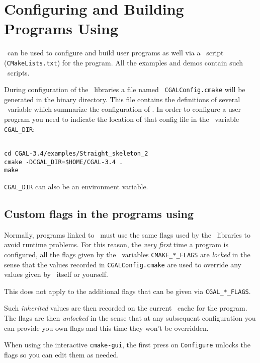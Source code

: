 \section{Configuring and Building Programs Using \cgal}

\cmake\ can be used to configure and build user programs as well via a \cmake\ 
script ({\tt CMakeLists.txt}) for the program.  All the examples and
demos contain such \cmake\ scripts.

During configuration of the \cgal\ libraries a file named {\tt
CGALConfig.cmake} will be generated in the binary directory. This file
contains the definitions of several \cmake\ variable which summarize the
configuration of \cgal. In order to configure a user program you need
to indicate the location of that config file in the \cmake\ variable
\texttt{CGAL\_DIR}:

{\ccTexHtml{\scriptsize}{}
\begin{verbatim}

cd CGAL-3.4/examples/Straight_skeleton_2
cmake -DCGAL_DIR=$HOME/CGAL-3.4 .
make

\end{verbatim}
}

\texttt{CGAL\_DIR} can also be an environment variable.

\subsection{Custom flags in the programs using \cgal}

Normally, programs linked to \cgal\ must use the same flags used by the \cgal\
libraries to avoid runtime problems. For this reason, the {\em very first} time
a program is configured, all the flags given by the \cmake\ variables \texttt{CMAKE\_*\_FLAGS}
are {\em locked} in the sense that the values recorded in \texttt{CGALConfig.cmake} 
are used to override any values given by \cmake\ itself or yourself.

This does not apply to the additional flags that can be given via \texttt{CGAL\_*\_FLAGS}.

Such {\em inherited} values are then recorded on the current \cmake\ cache for the program.
The flags are then {\em unlocked} in the sense that at any subsequent configuration you can
provide you own flags and this time they won't be overridden.

When using the interactive \texttt{cmake-gui}, the first press on \texttt{Configure} unlocks
the flags so you can edit them as needed. 

